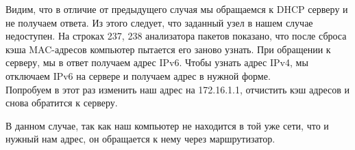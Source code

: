 \documentclass[a4paper,12pt]{article}
\begin{document}
\begin{figure}[H]
\end{figure}
Видим, что в отличие от предыдущего случая мы обращаемся к DHCP серверу и 
не получаем ответа. Из этого следует, что заданный узел в нашем случае недоступен.
На строках 237, 238 анализатора пакетов показано, что после сброса кэша MAC-адресов 
компьютер пытается его заново узнать. 
При обращении к серверу, мы в ответ получаем адрес IPv6.
Чтобы узнать адрес IPv4, мы отключаем IPv6 на сервере и получаем адрес в нужной форме.\\

Попробуем в этот раз изменить наш адрес на 172.16.1.1, отчистить кэш адресов
и снова обратится к серверу.
\begin{figure}[H]
\end{figure}
В данном случае, так как наш компьютер не находится в той уже сети, что и нужный нам адрес, 
он обращается к нему через маршрутизатор.\\
\end{document}
